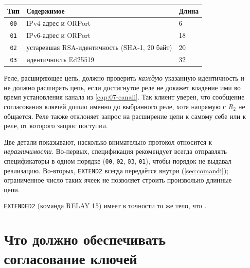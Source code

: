 \begin{center}
\begin{tabular}{cll}
\toprule
Тип & Содержимое & Длина \\
\midrule
\texttt{00} & IPv4-адрес и ORPort & 6 \\
\texttt{01} & IPv6-адрес и ORPort & 18 \\
\texttt{02} & устаревшая RSA-идентичность (SHA-1, 20 байт) & 20 \\
\texttt{03} & идентичность Ed25519 & 32 \\
\bottomrule
\end{tabular}
\end{center}

Реле, расширяющее цепь, должно проверить \emph{каждую} указанную идентичность и не должно расширять цепь, если достигнутое реле не докажет владение ими во время установления канала из \cref{cap:07-canali}. Так клиент уверен, что сообщение согласования ключей дошло именно до выбранного реле, хотя напрямую с $R_2$ не общается. Реле также отклоняет запрос на расширение цепи к самому себе или к реле, от которого запрос поступил.

Две детали показывают, насколько внимательно протокол относится к \emph{неразличимости}. Во-первых, спецификация рекомендует всегда отправлять спецификаторы в одном порядке (\texttt{00}, \texttt{02}, \texttt{03}, \texttt{01}), чтобы порядок не выдавал реализацию. Во-вторых, \texttt{EXTEND2} всегда передаётся внутри  (\cref{sec:comandi}); ограниченное число таких ячеек не позволяет строить произвольно длинные цепи.

\texttt{EXTENDED2} (команда RELAY 15) имеет в точности то же тело, что .

\section{Что должно обеспечивать согласование ключей}\label{sec:circ-requisiti}

